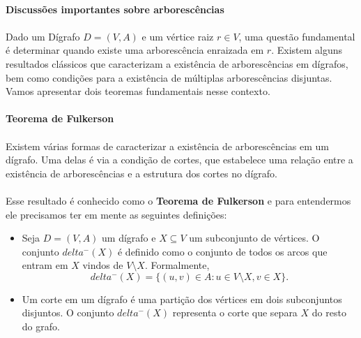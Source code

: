 \documentclass[12pt,a4paper]{article}
\def\delta{delta}%
\begin{document}
\paragraph{Discussões importantes sobre arborescências}

\paragraph{}
Dado um Dígrafo \(D = (V, A)\) e um vértice raiz \(r \in V\), uma questão fundamental é determinar quando existe uma arborescência enraizada em \(r\).
Existem alguns resultados clássicos que caracterizam a existência de arborescências em dígrafos, bem como condições para a existência de múltiplas arborescências disjuntas. Vamos apresentar dois teoremas fundamentais nesse contexto.

\paragraph{Teorema de Fulkerson}

\paragraph{}
Existem várias formas de caracterizar a existência de arborescências em um dígrafo. Uma delas é via a condição de cortes, que estabelece uma relação entre a existência de arborescências e a estrutura dos cortes no dígrafo.

\paragraph{}
Esse resultado é conhecido como o \textbf{Teorema de Fulkerson} e para entendermos ele precisamos ter em mente as seguintes definições:

\begin{itemize}
    \item Seja \(D = (V, A)\) um dígrafo e \(X \subseteq V\) um subconjunto de vértices. O conjunto \(\delta^-(X)\) é definido como o conjunto de todos os arcos que entram em \(X\) vindos de \(V \setminus X\). Formalmente,
          \[
              \delta^-(X) = \{(u, v) \in A : u \in V \setminus X, v \in X\}.
          \]
    \item Um corte em um dígrafo é uma partição dos vértices em dois subconjuntos disjuntos. O conjunto \(\delta^-(X)\) representa o corte que separa \(X\) do resto do grafo.
\end{itemize}
\end{document}
